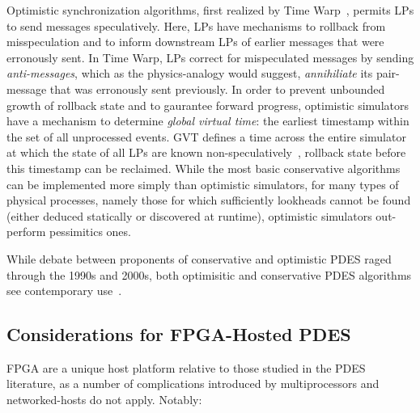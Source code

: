Optimistic synchronization algorithms, first realized by Time Warp~\cite{TimeWarp}, permits
LPs to send messages speculatively.  Here, LPs have mechanisms to rollback from
misspeculation and to inform downstream LPs of earlier messages that were
erronously sent. In Time Warp, LPs correct for mispeculated messages by
sending \emph{anti-messages}, which as the physics-analogy would suggest,
\emph{annihiliate} its pair-message that was erronously sent
previously. In order to prevent unbounded growth of rollback state and to
gaurantee forward progress, optimistic simulators have a mechanism to determine
\emph{global virtual time}: the earliest timestamp within the set of all
unprocessed events. GVT defines a time across the entire simulator at which
the state of all LPs are known non-speculatively~\cite{TimeWarp},
rollback state before this timestamp can be reclaimed. While the most
basic conservative algorithms can be implemented more simply than optimistic
simulators, for many types of physical processes, namely those for which
sufficiently lookheads cannot be found (either deduced statically or discovered
at runtime), optimistic simulators out-perform pessimitics ones.

While debate between proponents of conservative and optimistic PDES raged through
the 1990s and 2000s, both optimisitic and conservative PDES algorithms see
contemporary use~\cite{PDESRetrospective}.



\subsection{Considerations for FPGA-Hosted PDES}

FPGA are a unique host platform relative to those studied in the PDES
literature, as a number of complications introduced by multiprocessors and
networked-hosts do not apply. Notably:

